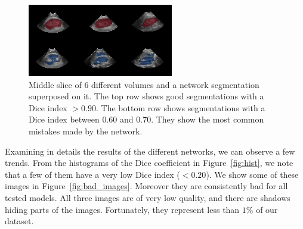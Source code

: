 \begin{figure}[htb]
	\includegraphics[width=\textwidth]{img_transfer/seg_good_bad}
    \caption{Middle slice of 6 different volumes and a network segmentation superposed on it. The top row shows good segmentations with a Dice index $> 0.90$. The bottom row shows segmentations with a Dice index between $0.60$ and $0.70$. They show the most common mistakes made by the network.}
    \label{fig:mseg}
\end{figure}

Examining in details the results of the different networks, we can observe a few trends. From the histograms of the Dice coefficient in Figure~\ref{fig:hist}, we note that a few of them have a very low Dice index ($< 0.20$). We show some of these images in Figure~\ref{fig:bad_images}. Moreover they are consistently bad for all tested models. All three images are of very low quality, and there are shadows hiding parts of the images. Fortunately, they represent less than $1 \%$ of our dataset.

